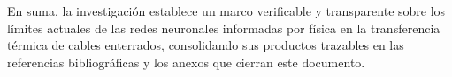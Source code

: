 En suma, la investigación establece un marco verificable y transparente sobre los límites actuales de las redes neuronales informadas por física en la transferencia térmica de cables enterrados, consolidando sus productos trazables en las referencias bibliográficas y los anexos que cierran este documento.
